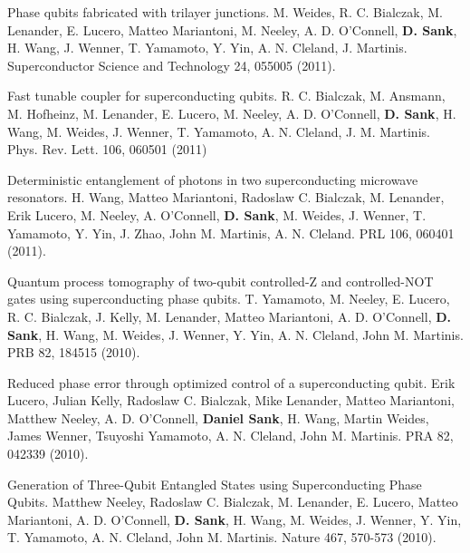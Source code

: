 \documentclass[margin=2cm,line]{res}
\begin{document}
\begin{resume}
\begin{list3}
\item Phase qubits fabricated with trilayer junctions. M. Weides, R. C. Bialczak, M. Lenander, E. Lucero, Matteo Mariantoni, M. Neeley, A. D. O'Connell, \textbf{D. Sank}, H. Wang, J. Wenner, T. Yamamoto, Y. Yin, A. N. Cleland, J. Martinis. Superconductor Science and Technology 24, 055005 (2011). \\

\item Fast tunable coupler for superconducting qubits. R. C. Bialczak, M. Ansmann, M. Hofheinz, M. Lenander, E. Lucero, M. Neeley, A. D. O'Connell, \textbf{D. Sank}, H. Wang, M. Weides, J. Wenner, T. Yamamoto, A. N. Cleland, J. M. Martinis. Phys. Rev. Lett. 106, 060501 (2011) \\

\item Deterministic entanglement of photons in two superconducting microwave resonators. H. Wang, Matteo Mariantoni, Radoslaw C. Bialczak, M. Lenander, Erik Lucero, M. Neeley, A. O'Connell, \textbf{D. Sank}, M. Weides, J. Wenner, T. Yamamoto, Y. Yin, J. Zhao, John M. Martinis, A. N. Cleland. PRL 106, 060401 (2011). \\

\item Quantum process tomography of two-qubit controlled-Z and controlled-NOT gates using superconducting phase qubits. T. Yamamoto, M. Neeley, E. Lucero, R. C. Bialczak, J. Kelly, M. Lenander, Matteo Mariantoni, A. D. O'Connell, \textbf{D. Sank}, H. Wang, M. Weides, J. Wenner, Y. Yin, A. N. Cleland, John M. Martinis. PRB 82, 184515 (2010). \\

\item Reduced phase error through optimized control of a superconducting qubit. Erik Lucero, Julian Kelly, Radoslaw C. Bialczak, Mike Lenander, Matteo Mariantoni, Matthew Neeley, A. D. O'Connell, \textbf{Daniel Sank}, H. Wang, Martin Weides, James Wenner, Tsuyoshi Yamamoto, A. N. Cleland, John M. Martinis. PRA 82, 042339 (2010). \\

\item Generation of Three-Qubit Entangled States using Superconducting Phase Qubits. Matthew Neeley, Radoslaw C. Bialczak, M. Lenander, E. Lucero, Matteo Mariantoni, A. D. O'Connell, \textbf{D. Sank}, H. Wang, M. Weides, J. Wenner, Y. Yin, T. Yamamoto, A. N. Cleland, John M. Martinis. Nature 467, 570-573 (2010). \\


\end{list3}
\end{resume}
\end{document}
